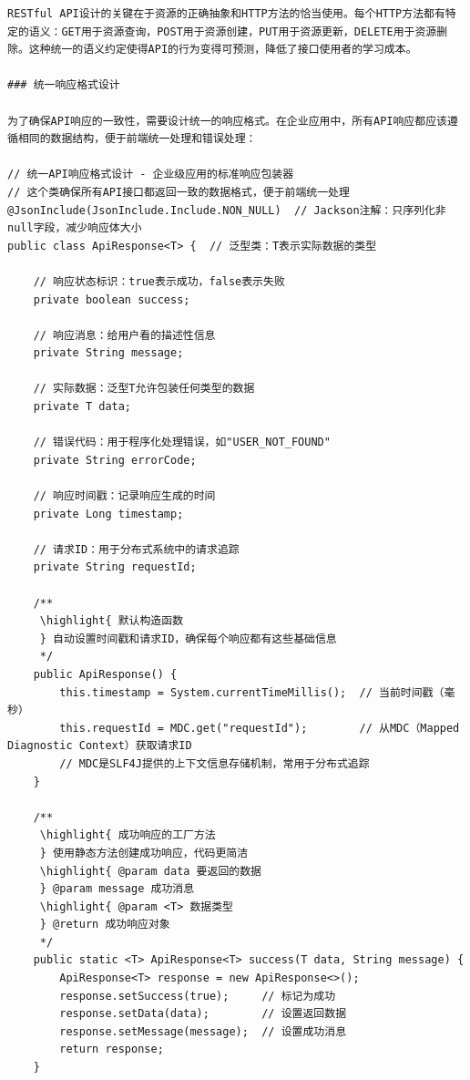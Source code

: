 \begin{lstlisting}
RESTful API设计的关键在于资源的正确抽象和HTTP方法的恰当使用。每个HTTP方法都有特定的语义：GET用于资源查询，POST用于资源创建，PUT用于资源更新，DELETE用于资源删除。这种统一的语义约定使得API的行为变得可预测，降低了接口使用者的学习成本。

### 统一响应格式设计

为了确保API响应的一致性，需要设计统一的响应格式。在企业应用中，所有API响应都应该遵循相同的数据结构，便于前端统一处理和错误处理：

// 统一API响应格式设计 - 企业级应用的标准响应包装器
// 这个类确保所有API接口都返回一致的数据格式，便于前端统一处理
@JsonInclude(JsonInclude.Include.NON_NULL)  // Jackson注解：只序列化非null字段，减少响应体大小
public class ApiResponse<T> {  // 泛型类：T表示实际数据的类型
    
    // 响应状态标识：true表示成功，false表示失败
    private boolean success;
    
    // 响应消息：给用户看的描述性信息
    private String message;
    
    // 实际数据：泛型T允许包装任何类型的数据
    private T data;
    
    // 错误代码：用于程序化处理错误，如"USER_NOT_FOUND"
    private String errorCode;
    
    // 响应时间戳：记录响应生成的时间
    private Long timestamp;
    
    // 请求ID：用于分布式系统中的请求追踪
    private String requestId;
    
    /**
     \highlight{ 默认构造函数
     } 自动设置时间戳和请求ID，确保每个响应都有这些基础信息
     */
    public ApiResponse() {
        this.timestamp = System.currentTimeMillis();  // 当前时间戳（毫秒）
        this.requestId = MDC.get("requestId");        // 从MDC（Mapped Diagnostic Context）获取请求ID
        // MDC是SLF4J提供的上下文信息存储机制，常用于分布式追踪
    }
    
    /**
     \highlight{ 成功响应的工厂方法
     } 使用静态方法创建成功响应，代码更简洁
     \highlight{ @param data 要返回的数据
     } @param message 成功消息
     \highlight{ @param <T> 数据类型
     } @return 成功响应对象
     */
    public static <T> ApiResponse<T> success(T data, String message) {
        ApiResponse<T> response = new ApiResponse<>();
        response.setSuccess(true);     // 标记为成功
        response.setData(data);        // 设置返回数据
        response.setMessage(message);  // 设置成功消息
        return response;
    }
    

\end{lstlisting}
